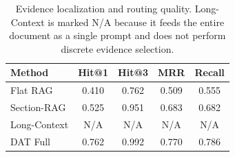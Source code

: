 \begin{table}[t]
\centering
\caption{Evidence localization and routing quality. Long-Context is marked N/A because it feeds the entire document as a single prompt and does not perform discrete evidence selection.}
\label{tab:routing}
\begin{tabular}{lcccc}
\toprule
\textbf{Method} & \textbf{Hit@1} & \textbf{Hit@3} & \textbf{MRR} & \textbf{Recall} \\
\midrule
Flat RAG & 0.410 & 0.762 & 0.509 & 0.555 \\
Section-RAG & 0.525 & 0.951 & 0.683 & 0.682 \\
Long-Context & N/A & N/A & N/A & N/A \\
DAT Full & 0.762 & 0.992 & 0.770 & 0.786 \\
\bottomrule
\end{tabular}
\end{table}
